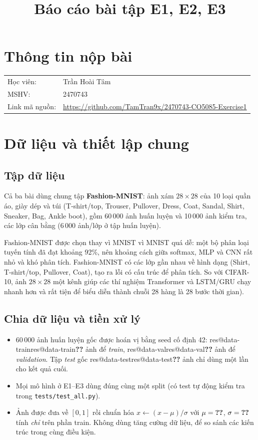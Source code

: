 \documentclass[twoside,final]{hcmut-report}
\title{Báo cáo bài tập E1, E2, E3}
\makeatletter
\newcommand{\hocvien}{Trần Hoài Tâm}
\newcommand{\mshv}{2470743}
\newcommand{\repourl}{https://github.com/TamTran9x/2470743-CO5085-Exercise1}
\newcommand{\res}[1]{\ifcsname res@#1\endcsname\csname res@#1\endcsname\else\textbf{??}\fi}
\makeatother
\begin{document}
\coverpage%

\section*{Thông tin nộp bài}
\begin{tabular}{@{}ll@{}}
Học viên:     & \hocvien{} \\
MSHV: & \mshv \\
Link mã nguồn:     & \url{\repourl} \\
\end{tabular}

\tableofcontents
\listoffigures
\listoftables
\lstlistoflistings{}

\clearpage

\section{Dữ liệu và thiết lập chung}

\subsection{Tập dữ liệu}
Cả ba bài dùng chung tập \textbf{Fashion-MNIST}: ảnh xám $28\times28$ của 10 loại quần áo, giày dép và túi (T-shirt/top, Trouser, Pullover, Dress, Coat, Sandal, Shirt, Sneaker, Bag, Ankle boot), gồm 60\,000 ảnh huấn luyện và 10\,000 ảnh kiểm tra, các lớp cân bằng (6\,000 ảnh/lớp ở tập huấn luyện).

Fashion-MNIST được chọn thay vì MNIST vì MNIST quá dễ: một bộ phân loại tuyến tính đã đạt khoảng 92\%, nên khoảng cách giữa softmax, MLP và CNN rất nhỏ và khó phân tích. Fashion-MNIST có các lớp gần nhau về hình dạng (Shirt, T-shirt/top, Pullover, Coat), tạo ra lỗi có cấu trúc để phân tích. So với CIFAR-10, ảnh $28\times28$ một kênh giúp các thí nghiệm Transformer và LSTM/GRU chạy nhanh hơn và rất tiện để biểu diễn thành chuỗi 28 hàng là 28 bước thời gian).

\subsection{Chia dữ liệu và tiền xử lý}
\begin{itemize}
  \item 60\,000 ảnh huấn luyện gốc được hoán vị bằng seed cố định 42: \res{data-train} ảnh để \emph{train}, \res{data-val} ảnh để \emph{validation}. Tập \emph{test} gốc \res{data-test} ảnh chỉ dùng một lần cho kết quả cuối.
  \item Mọi mô hình ở E1–E3 dùng đúng cùng một split (có test tự động kiểm tra trong \texttt{tests/test\_all.py}).
  \item Ảnh được đưa về $[0,1]$ rồi chuẩn hóa $x \leftarrow (x-\mu)/\sigma$ với $\mu=\res{data-mean}$,
        $\sigma=\res{data-std}$ tính \emph{chỉ} trên phần train. Không dùng tăng cường dữ liệu, để so sánh các kiến trúc trong cùng điều kiện.
\end{itemize}
\end{document}
